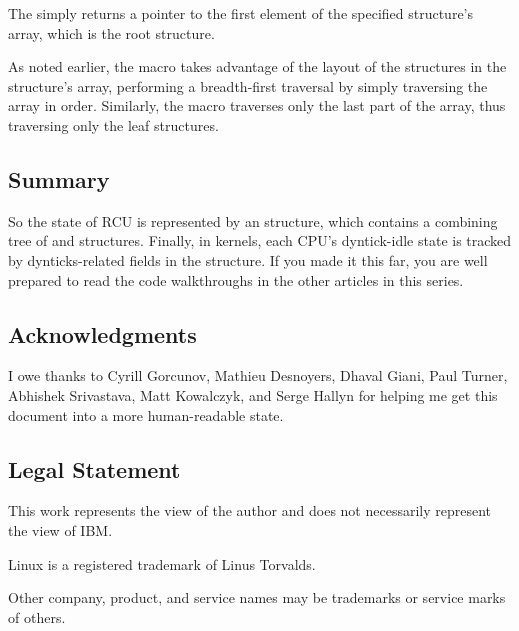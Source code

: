 The  simply returns a pointer to the first element of
the specified  structure's  array, which is the
root  structure.

As noted earlier, the  macro takes
advantage of the layout of the  structures in the
 structure's  array, performing a breadth-first
traversal by simply traversing the array in order.
Similarly, the
 macro traverses only the last part of the
array, thus traversing only the leaf  structures.

\QuickQuizEnd

\subsection{Summary}

So the state of RCU is represented by an  structure, which
contains a combining tree of  and  structures.
Finally, in  kernels, each CPU's dyntick-idle state
is tracked by dynticks-related fields in the  structure.
If
you made it this far, you are well prepared to read the code
walkthroughs in the other articles in this series.

\subsection{Acknowledgments}

I owe thanks to Cyrill Gorcunov, Mathieu Desnoyers, Dhaval Giani, Paul
Turner, Abhishek Srivastava, Matt Kowalczyk, and Serge Hallyn for
helping me get this document into a more human-readable state.

\subsection{Legal Statement}

This work represents the view of the author and does not necessarily
represent the view of IBM\@.

Linux is a registered trademark of Linus Torvalds.

Other company, product, and service names may be trademarks or service
marks of others.
